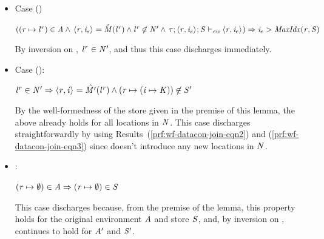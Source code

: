 \begin{bproof}
\begin{bcase}[\dregpardataconjoin{}]
\begin{enumerate}
\begin{itemize}
\begin{itemize}
\begin{itemize}
\begin{itemize}[label=$\circ$]
By the well-formedness of the store given in the premise of this lemma,
the above already holds for locations in the environments $\AENV$ and $\NENV$.
%
This case discharges straightforwardly by using Results~(\ref{prf:wf-datacon-join-eqn2}) and (\ref{prf:wf-datacon-join-eqn3}) since \dregpardataconjoin{} doesn't introduce any new
locations in $\AENV$ and $\NENV$.


\item Case ()

$ ((\mathit{r} \mapsto {\mathit{l}}^{\mathit{r}}) \in \mathit{A} \wedge 
    \, \langle \mathit{r}, \mathit{i}_s \rangle ^{} = \hat{\mathit{M}}({\mathit{l}}^{\mathit{r}}) \wedge
    {\mathit{l}}^{\mathit{r}} \not \in \mathit{N}' \wedge
    \, \mathit{\tau};\langle \mathit{r}, \mathit{i}_s \rangle ^{};\mathit{S} \vdash_{\textit{ew}} \langle \mathit{r}, \mathit{i}_e \rangle ^{}) \Rightarrow
          \mathit{i}_e > \mathit{MaxIdx}(\mathit{r},\mathit{S})
          $

By inversion on \tdataconivars{}, ${\mathit{l}}^{\mathit{r}} \in \mathit{N}'$, and thus this
case discharges immediately.


\item Case ():

$ {\mathit{l}}^{\mathit{r}} \in \mathit{N}' \Rightarrow
          \langle \mathit{r}, \mathit{i} \rangle ^{} = \hat{\mathit{M}'}({\mathit{l}}^{\mathit{r}}) \wedge
          (\mathit{r} \mapsto (\mathit{i} \mapsto \mathit{K})) \not \in \mathit{S}'
          $

By the well-formedness of the store given in the premise of this lemma,
the above already holds for all locations in $\NENV$.
%
This case discharges straightforwardly by using Results~(\ref{prf:wf-datacon-join-eqn2}) and (\ref{prf:wf-datacon-join-eqn3}) since \dregpardataconjoin{} doesn't introduce any new
locations in $\NENV$.


\item {}:

$(\mathit{r} \mapsto \emptyset) \in \mathit{A} \Rightarrow (\mathit{r} \mapsto \emptyset) \in \mathit{S}$

This case discharges because, from the premise of the
lemma, this property holds for the original environment
$\AENV$ and store $\mathit{S}$, and, by inversion on \tdataconivars{},
continues to hold for $\mathit{A}'$ and $\mathit{S}'$.

\end{itemize}



\end{itemize}
\end{itemize}
\end{itemize}
\end{enumerate}
\end{bcase}
\end{bproof}
